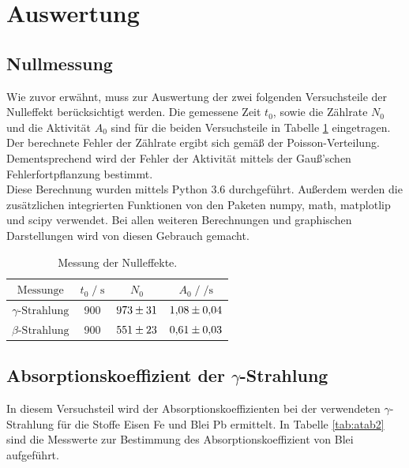 \section{Auswertung}
\label{sec:Auswertung}

\subsection{Nullmessung}

Wie zuvor erwähnt, muss zur Auswertung der zwei folgenden Versuchsteile der Nulleffekt berücksichtigt 
werden. Die gemessene Zeit $t_0$, sowie die Zählrate $N_0$ und die Aktivität $A_0$ sind für die beiden
Versuchsteile in Tabelle \ref{tab:null} eingetragen. Der berechnete Fehler der Zählrate ergibt sich gemäß der 
Poisson-Verteilung. Dementsprechend wird der Fehler der Aktivität mittels der Gauß'schen Fehlerfortpflanzung
bestimmt. \\
Diese Berechnung wurden mittels Python 3.6 durchgeführt. Außerdem werden die zusätzlichen integrierten 
Funktionen von den Paketen numpy, math, matplotlip und scipy verwendet. Bei allen weiteren Berechnungen und
graphischen Darstellungen wird von diesen Gebrauch gemacht. 

\begin{table}
    \centering
    \caption{Messung der Nulleffekte.}
    \label{tab:null}
    \begin{tabular}{c c c c}
    \toprule
    $\text{Messunge}$ & $ t_0 \;/\; \si{\second} $  & $N_0$ & $A_0 \;/\; \si{\per\second}$\\
    \midrule 
        $\gamma \text{-Strahlung}$ & 900 & $\num{973+-31}$ & $\num{1.08+-0.04}$\\
        $\beta \text{-Strahlung}$  & 900 & $\num{551+-23}$ & $\num{0.61+-0.03}$\\     
    \bottomrule
    \end{tabular}
\end{table}

\subsection{Absorptionskoeffizient der \texorpdfstring{$\gamma$}{}-Strahlung}

In diesem Versuchsteil wird der Absorptionskoeffizienten bei der verwendeten $\gamma$-Strahlung für die 
Stoffe Eisen Fe und Blei Pb ermittelt. In Tabelle \ref{tab:atab2} sind die Messwerte zur Bestimmung 
des Absorptionskoeffizient von Blei aufgeführt.  

